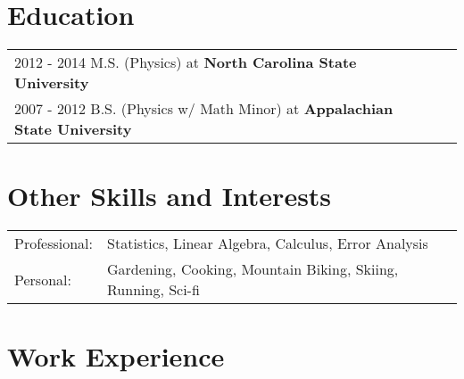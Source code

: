 \documentclass[a4paper,12pt]{article}
\begin{document}
\section{Education}
\begin{tabularx}{\linewidth}{@{}l X@{}}
2012 - 2014 M.S. (Physics) at \textbf{North Carolina State University} \hfill \normalsize \\
2007 - 2012 B.S. (Physics w/ Math Minor) at \textbf{Appalachian State University} \hfill

\end{tabularx}

\section{Other Skills and Interests}
\begin{tabularx}{\linewidth}{@{}l X@{}}
Professional: &  \normalsize{Statistics, Linear Algebra, Calculus, Error Analysis}\\
Personal:  &  \normalsize{Gardening, Cooking, Mountain Biking, Skiing, Running, Sci-fi}\\
\end{tabularx}




\section{Work Experience}
\end{document}
